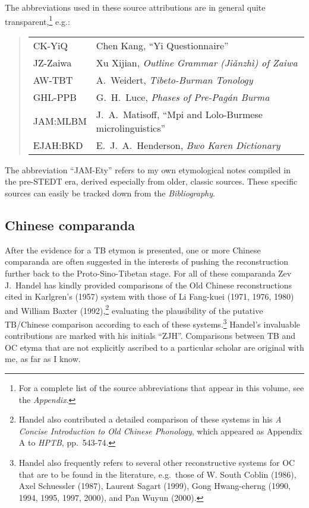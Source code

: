 The abbreviations used in these source attributions are in general quite
transparent,\footnote{For a complete list of the source abbreviations that
appear in this volume, see the \textit{Appendix}.} e.g.:

\begin{quote}
\begin{tabular}{ll}
CK-YiQ	&Chen Kang, “Yi Questionnaire”\\
JZ-Zaiwa	&Xu Xijian, \textit{Outline Grammar (Jiǎnzhì) of Zaiwa}\\
AW-TBT	&A.~Weidert, \textit{Tibeto-Burman Tonology}\\
GHL-PPB	&G.~H.~Luce, \textit{Phases of Pre-Pagán Burma}\\
JAM:MLBM	&J.~A.~Matisoff, “Mpi and Lolo-Burmese microlinguistics”\\
EJAH:BKD	&E.~J.~A.~Henderson, \textit{Bwo Karen Dictionary}\\
\end{tabular}
\end{quote}

The abbreviation “JAM-Ety” refers to my own etymological notes compiled in the
pre-STEDT era, derived especially from older, classic sources.  These specific
sources can easily be tracked down from the \textit{Bibliography}.

\subsection{Chinese comparanda}

After the evidence for a TB etymon is presented, one or more Chinese
comparanda are often suggested in the interests of pushing the reconstruction
further back to the Proto-Sino-Tibetan stage.  For all of these comparanda
Zev J.\ Handel has kindly provided comparisons of the Old Chinese reconstructions cited
in Karlgren’s (1957) system with those of Li Fang-kuei (1971, 1976, 1980) and
William Baxter (1992),\footnote{Handel also contributed a detailed comparison
of these systems in his \textit{A Concise Introduction to Old Chinese Phonology},
which appeared as Appendix A to \textit{HPTB}, pp.~543-74.}
evaluating the plausibility of the
putative TB/Chinese comparison according to each of these systems.\footnote{Handel  also frequently refers to several other reconstructive systems for OC that are to be found
in the literature, e.g.\ those of W. South Coblin (1986), Axel Schuessler (1987),
Laurent Sagart (1999), Gong Hwang-cherng (1990, 1994, 1995, 1997, 2000), and Pan
Wuyun (2000).}   Handel’s invaluable contributions are marked with his initials “ZJH”. 
Comparisons between TB and OC etyma that are not explicitly ascribed to a
particular scholar are original with me, as far as I know.


